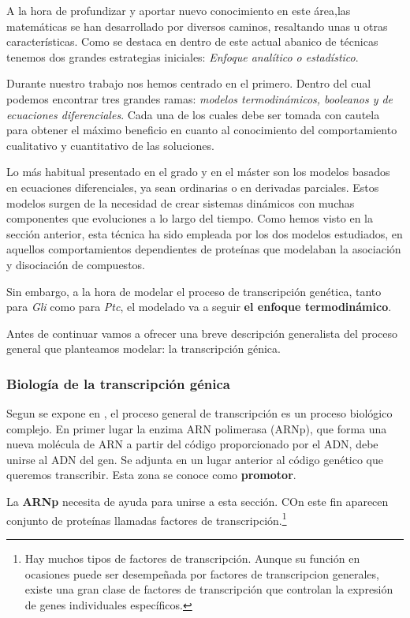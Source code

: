   A la hora de profundizar y aportar nuevo conocimiento en este área,las matemáticas se han desarrollado por diversos caminos, resaltando unas u otras características. Como se destaca en \cite{ay2011mathematical} dentro de este actual abanico de técnicas tenemos dos grandes estrategias iniciales: \textit{Enfoque analítico o estadístico}. 
  
  Durante nuestro trabajo nos hemos centrado en el primero. Dentro del cual podemos encontrar tres grandes ramas: \textit{modelos termodinámicos, booleanos y de ecuaciones diferenciales}. Cada una de los cuales debe ser tomada con cautela para obtener el máximo beneficio en cuanto al conocimiento del comportamiento cualitativo y cuantitativo de las soluciones. 
 
 Lo más habitual presentado en el grado y en el máster son los modelos basados en ecuaciones diferenciales, ya sean ordinarias o en derivadas parciales. Estos modelos surgen de la necesidad de crear sistemas dinámicos con muchas componentes que evoluciones a lo largo del tiempo. Como hemos visto en la sección anterior, esta técnica ha sido empleada por los dos modelos estudiados, en aquellos comportamientos dependientes de proteínas que modelaban la asociación y disociación de compuestos.
 
 Sin embargo, a la hora de modelar el proceso de transcripción genética, tanto para \textit{Gli} como para \textit{Ptc}, el modelado va a seguir \textbf{el enfoque termodinámico}. 
 
 Antes de continuar vamos a ofrecer una breve descripción generalista del proceso general que planteamos modelar: la transcripción génica.
 
 \subsubsection{Biología de la transcripción génica}
 Segun se expone en \cite{biologia}, el proceso general de transcripción es un proceso biológico complejo. En primer lugar la enzima ARN polimerasa (ARNp), que forma una nueva molécula de ARN a partir del código proporcionado por el ADN, debe unirse al ADN del gen. Se adjunta en un lugar anterior al código genético que queremos transcribir. Esta zona se conoce como \textbf{promotor}.
 
 La \textbf{ARNp} necesita de ayuda para unirse a esta sección. COn este fin aparecen conjunto de proteínas llamadas factores de transcripción.\footnote{Hay muchos tipos de factores de transcripción. Aunque su función en ocasiones puede ser desempeñada por factores de transcripcion generales, existe una gran clase de factores de transcripción que controlan la expresión de genes individuales específicos.}
 
